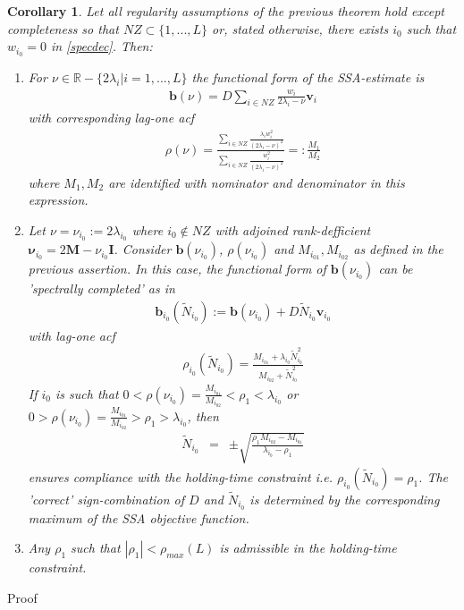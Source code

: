 \documentclass[a4paper]{article}
\newtheorem{Corollary}{Corollary}
\begin{document}
\begin{Corollary}\label{incomplete_spec_sup}
Let all regularity assumptions of the previous theorem hold except completeness so that $NZ\subset \{1,...,L\}$ or, stated otherwise, there exists $i_0$ such that $w_{i_0}=0$ in \ref{specdec}. Then:
\begin{enumerate}
\item For $\nu\in \mathbb{R}-\{2\lambda_i|i=1,...,L\}$ the functional form of the SSA-estimate is 
\begin{eqnarray}\label{diff_non_home_singular}
\mathbf{b}(\nu)=D\sum_{i\in NZ} \frac{w_i}{2\lambda_{i}-\nu}\mathbf{v}_{i}
\end{eqnarray}
with corresponding lag-one acf 
\begin{eqnarray}\label{sefrhobnotcomp}
\rho(\nu)=\frac{\sum_{i\in NZ}\frac{\lambda_iw_i^2}{(2\lambda_i-\nu)^2}}{\sum_{i\in NZ}\frac{w_i^2}{(2\lambda_i-\nu)^2}}=:\frac{M_{1}}{M_{2}}
\end{eqnarray}
where $M_{1},M_{2}$ are identified with nominator and denominator in this expression. 

\item Let $\nu=\nu_{i_0}:=2\lambda_{i_0}$ where $i_0\notin NZ$ with adjoined rank-defficient $\boldsymbol{\nu}_{i_0}=2\mathbf{M}-\nu_{i_0}\mathbf{I}$. Consider $\mathbf{b}(\nu_{i_0})$, $\rho(\nu_{i_0})$ and $M_{i_01},M_{i_02}$ as defined in the previous assertion. In this case, the functional form of $\mathbf{b}(\nu_{i_0})$ can be 'spectrally completed' as in 
\begin{eqnarray}\label{b_new_comp}  
\mathbf{b}_{i_0}(\tilde{N}_{i_0}):=\mathbf{b}(\nu_{i_0})+D\tilde{N}_{i_0}\mathbf{v}_{i_0}
\end{eqnarray}
with lag-one acf
\begin{eqnarray}\label{sefrhobcomp}  
\rho_{{i_0}}(\tilde{N}_{i_0})=\frac{M_{i_01}+\lambda_{i_0}\tilde{N}_{i_0}^2}{M_{i_02}+\tilde{N}_{i_0}^2}
\end{eqnarray}
If $i_0$ is such that $0<\rho(\nu_{i_0})=\frac{M_{i_01}}{M_{i_02}}< \rho_1<\lambda_{i_0}$ or $0>\rho(\nu_{i_0})=\frac{M_{i_01}}{M_{i_02}}> \rho_1>\lambda_{i_0}$, then 
\begin{eqnarray}\label{N_comp}
\tilde{N}_{i_0}&=&\pm\sqrt{\frac{\rho_1M_{i_02}-M_{i_01}}{\lambda_{i_0}-\rho_1}}
\end{eqnarray}
ensures compliance with the holding-time constraint i.e. $\rho_{{i_0}}(\tilde{N}_{i_0})=\rho_1$. The 'correct' sign-combination of $D$ and $\tilde{N}_{i_0}$ is determined by the corresponding maximum  of the SSA objective function.
\item Any $\rho_1$ such that $|\rho_1|<\rho_{max}(L)$ is admissible in the holding-time constraint.
\end{enumerate}
\end{Corollary}
Proof\\
\end{document}
